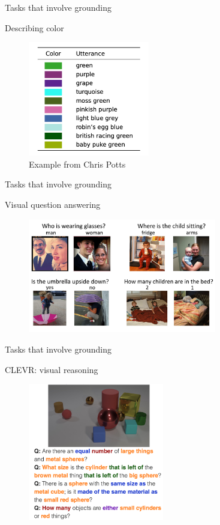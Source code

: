 \documentclass[usenames,dvipsnames,11pt,aspectratio=169]{beamer}
\begin{document}
\begin{frame}
    {Tasks that involve grounding}

    Describing color 
    \vspace{-1em}
    \begin{figure}
        \includegraphics[height=5cm]{figures/color}
        \caption{Example from Chris Potts}
    \end{figure}
\end{frame}

\begin{frame}
    {Tasks that involve grounding}

    Visual question answering \mycite{[Agrawal+ 2015]}
    \vspace{-1em}
    \begin{figure}
        \includegraphics[height=5cm]{figures/vqa}
    \end{figure}
\end{frame}

\begin{frame}
    {Tasks that involve grounding}

    CLEVR: visual reasoning \mycite{[Johnson+ 2015]}
    \vspace{-1em}
    \begin{figure}
        \includegraphics[height=6cm]{figures/clevr}
    \end{figure}
\end{frame}
\end{document}

